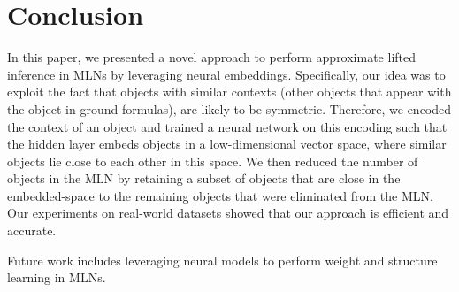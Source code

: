 \section{Conclusion}

In this paper, we presented a novel approach to perform approximate lifted inference in MLNs by leveraging neural embeddings. Specifically, our idea was to exploit the fact that objects with similar contexts (other objects that appear with the object in ground formulas), are likely to be symmetric. Therefore, we encoded the context of an object and trained a neural network on this encoding such that the hidden layer embeds objects in a low-dimensional vector space, where similar objects lie close to each other in this space. We then reduced the number of objects in the MLN by retaining a subset of objects that are close in the embedded-space to the remaining objects that were eliminated from the MLN. Our experiments on real-world datasets showed that our approach is efficient and accurate.

Future work includes leveraging neural models to perform weight and structure learning in MLNs.